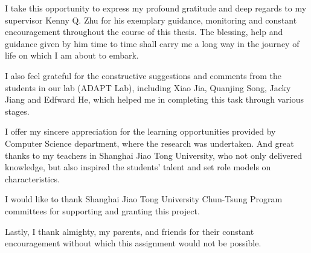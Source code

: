 I take this opportunity to express my profound gratitude and deep regards to my supervisor Kenny Q. Zhu for his exemplary guidance, monitoring and constant encouragement throughout the course of this thesis. The blessing, help and guidance given by him time to time shall carry me a long way in the journey of life on which I am about to embark.

I also feel grateful for the constructive suggestions and comments from the students in our lab (ADAPT Lab), including Xiao Jia, Quanjing Song, Jacky Jiang and Edfward He, which helped me in completing this task through various stages.

I offer my sincere appreciation for the learning opportunities provided by Computer Science department, where the research was undertaken. And great thanks to my teachers in Shanghai Jiao Tong University, who not only delivered knowledge, but also inspired the students' talent and set role models on characteristics.

I would like to thank Shanghai Jiao Tong University Chun-Tsung Program committees for supporting and granting this project.

Lastly, I thank almighty, my parents, and friends for their constant encouragement without which this assignment would not be possible.

